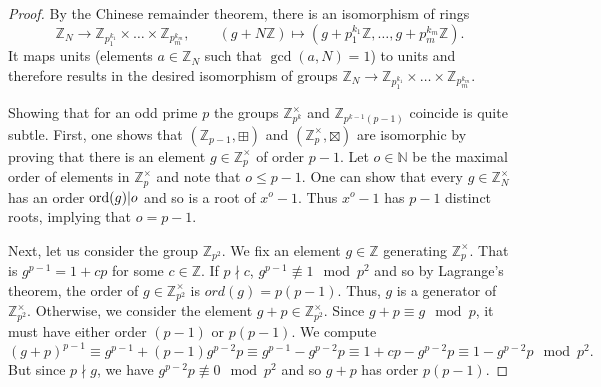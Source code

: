 \documentclass[a4paper, oneside, 12pt]{amsart}
\begin{document}
\begin{proof}
  By the {\color{gray} Chinese remainder theorem},
  there is an {\color{gray} isomorphism of rings}
  \begin{equation*}
    \mathbb{Z}_{N} \to \mathbb{Z}_{p_{1}^{k_{1}}} \times \dots \times \mathbb{Z}_{p_{m}^{k_{m}}}, \qquad (g + N \mathbb{Z}) \mapsto (g + p_{1}^{k_{1}} \mathbb{Z}, \dots , g + p_{m}^{k_{m}} \mathbb{Z}).
  \end{equation*}
  It maps {\color{gray} units} (\ie elements \(a\in \mathbb{Z}_{N}\) such that \(\gcd(a,N)=1\)) to units and therefore results in the desired isomorphism of groups \(\mathbb{Z}_{N} \to \mathbb{Z}_{p_{1}^{k_{1}}} \times \dots \times \mathbb{Z}_{p_{m}^{k_{m}}}\).

  Showing that for an odd prime \(p\) the groups \( \mathbb{Z}_{p^{k}}^{\times}\) and \( \mathbb{Z}_{p^{k-1}(p-1)}\) coincide is quite subtle.
  First, one shows that \(( \mathbb{Z}_{p-1}, \boxplus)\) and \((\mathbb{Z}_{p}^{\times}, \boxtimes)\)  are isomorphic by proving that there is an element \(g\in \mathbb{Z}_{p}^{\times}\) of order \(p-1\).
  Let \(o \in \mathbb{N}\) be the maximal order of elements in \( \mathbb{Z}_{p}^{\times}\) and note that \(o \leq p-1\).
  One can show that every \(g\in \mathbb{Z}_{N}^{\times}\) has an order \(\operatorname{ord}(g) | o\) and so is a root of \(x^{o}-1\).
  Thus \(x^{o}-1\) has \(p-1\) distinct roots, implying  that \(o=p-1\).

  Next, let us consider  the group \( \mathbb{Z}_{p^{2}}\).
  We fix an element \(g \in \mathbb{Z}\) generating \( \mathbb{Z}_{p}^{\times}\).
  That is \(g^{p-1} = 1+ cp\) for some \(c \in \mathbb{Z}\).
  If \(p\nmid c\), \(g^{p-1} \nequiv 1 \mod p^{2}\) and so by {\color{gray} Lagrange's theorem}, the order of \(g\in \mathbb{Z}_{p^{2}}^{\times}\) is \(ord(g) =p(p-1)\).
  Thus, \(g\) is a generator of \( \mathbb{Z}_{p^{2}}^{\times}\).
  Otherwise, we consider the element \(g+p\in \mathbb{Z}_{p^{2}}^{\times}\).
  Since \(g+p \equiv g \mod p\), it must have either order \((p-1)\) or \(p(p-1)\).
  We compute
  \begin{equation*}
    (g+p)^{p-1}
    \equiv g^{p-1} + (p-1)g^{p-2}p
    \equiv g^{p-1}- g^{p-2}p
    \equiv 1 +cp - g^{p-2}p
    \equiv 1 - g^{p-2}p \mod p^{2}.
  \end{equation*}
  But since  \(p \nmid g\), we have \(g^{p-2}p \nequiv 0 \mod p^{2}\) and so \(g+p\) has order \(p(p-1)\).


\end{proof}
\end{document}
